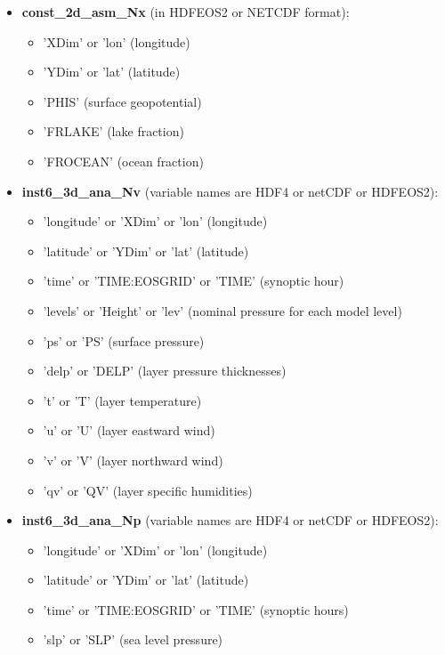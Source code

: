\begin{itemize}
\item \textbf{const\_2d\_asm\_Nx} (in HDFEOS2 or NETCDF format):
  \begin{itemize}
  \item 'XDim'  or 'lon' (longitude)
  \item 'YDim' or 'lat' (latitude)
  \item 'PHIS' (surface geopotential)
  \item 'FRLAKE' (lake fraction)
  \item 'FROCEAN' (ocean fraction)
  \end{itemize}

\item \textbf{inst6\_3d\_ana\_Nv} (variable names are HDF4 or netCDF or 
HDFEOS2):
  \begin{itemize}
  \item 'longitude' or 'XDim'  or 'lon' (longitude)
  \item 'latitude' or 'YDim' or 'lat' (latitude)
  \item 'time' or 'TIME:EOSGRID' or 'TIME' (synoptic hour)
  \item 'levels' or 'Height' or 'lev' (nominal pressure for each model level)
  \item 'ps' or 'PS' (surface pressure)
  \item 'delp' or 'DELP' (layer pressure thicknesses)
  \item 't' or 'T' (layer temperature)
  \item 'u' or 'U' (layer eastward wind)
  \item 'v' or 'V' (layer northward wind)
  \item 'qv' or 'QV' (layer specific humidities)
  \end{itemize}

\item \textbf{inst6\_3d\_ana\_Np} (variable names are HDF4 or netCDF or 
HDFEOS2):
  \begin{itemize}
  \item 'longitude' or 'XDim' or 'lon' (longitude)
  \item 'latitude' or 'YDim' or 'lat' (latitude)
  \item 'time' or 'TIME:EOSGRID' or 'TIME' (synoptic hours)
  \item 'slp' or 'SLP' (sea level pressure)
  \end{itemize}


\end{itemize}
